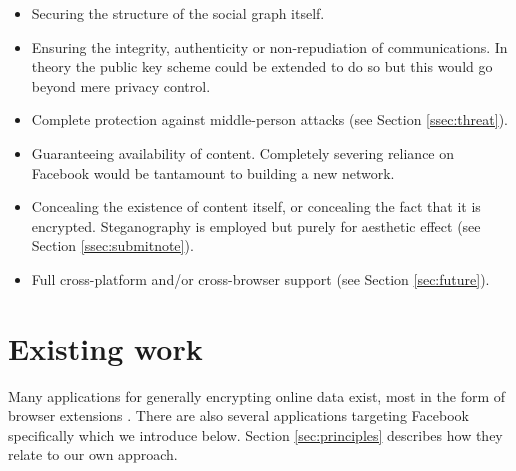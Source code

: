 \begin{itemize}

    \item Securing the structure of the social graph itself.
    
    \item Ensuring the integrity, authenticity or non-repudiation of communications. In theory the public key scheme could be extended to do so but this would go beyond mere privacy control.

    \item Complete protection against middle-person attacks (see Section \ref{ssec:threat}).
    
    \item Guaranteeing availability of content. Completely severing reliance on Facebook would be tantamount to building a new network.
    
    \item Concealing the existence of content itself, or concealing the fact that it is encrypted. Steganography is employed but purely for aesthetic effect (see Section \ref{ssec:submitnote}).
    
    \item Full cross-platform and/or cross-browser support (see Section \ref{sec:future}).
    
\end{itemize}


\section{Existing work}
\label{sec:existing}

    Many applications for generally encrypting online data exist, most in the form of browser extensions \cite{firegpg}. There are also several applications targeting Facebook specifically which we introduce below. Section \ref{sec:principles} describes how they relate to our own approach.
    
